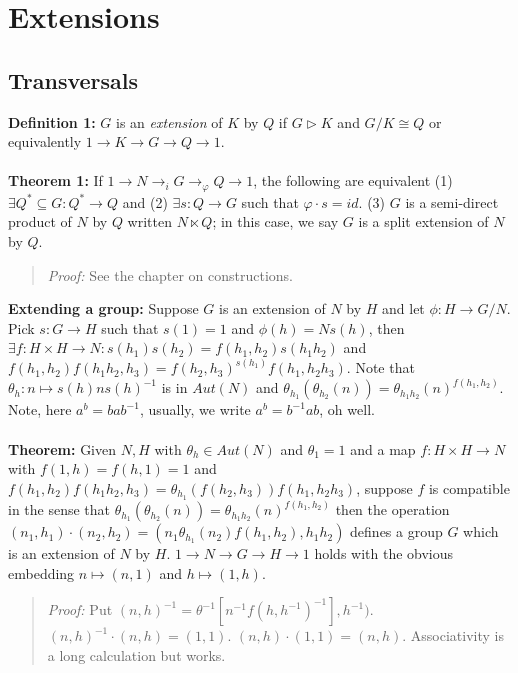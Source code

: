 \chapter{Extensions}
\section {Transversals} 
{\bf Definition 1:}
$G$ is an \emph{extension} of $K$ by $Q$ if $G \triangleright K$ and $G/K \cong Q$
or equivalently $1 \rightarrow K \rightarrow G \rightarrow Q \rightarrow 1$.
\\
\\
{\bf Theorem 1:}
If $1 \rightarrow N \rightarrow_{i} G \rightarrow_{\varphi} Q \rightarrow 1$, the following
are equivalent
(1) $\exists Q^* \subseteq G: Q^* \rightarrow Q$ and
(2) $\exists s:Q \rightarrow G$ such that $\varphi \cdot s = id$.
(3) $G$ is a semi-direct product of $N$ by $Q$ written $N \ltimes Q$; in this
case, we say $G$ is a split extension of $N$ by $Q$.
\begin{quote}
\emph{Proof:}  See the chapter on constructions.
\end{quote}
{\bf Extending a group:}
Suppose $G$ is an extension of $N$ by $H$ and let $\phi: H \rightarrow G/N$.  Pick
$s:G \rightarrow H$ such that $s(1)=1$ and $\phi(h) = N s(h)$, then 
$\exists f: H \times H \rightarrow N: s(h_1) s(h_2)= f(h_1, h_2) s(h_1 h_2)$
and $f(h_1, h_2) f(h_1 h_2, h_3)= f(h_2, h_3)^{s(h_1)} f(h_1 , h_2 h_3)$.  Note
that $\theta_h: n \mapsto s(h) n s(h)^{-1}$ is in $Aut(N)$ and
$\theta_{h_1}(\theta_{h_2}(n))= \theta_{h_1 h_2}(n)^{f(h_1, h_2)}$.  Note, here $a^b = b a b^{-1}$, usually,
we write $a^b = b ^ {-1} a b$, oh well.
\\
\\
{\bf Theorem:}
Given $N,H$ with $\theta_h \in Aut(N)$ and $\theta_1 = 1$ and a map
$f: H \times H \rightarrow N$ with $f(1,h)=f(h,1)=1$ and
$f(h_1, h_2) f(h_1 h_2 , h_3)= \theta_{h_1}(f(h_2, h_3)) f(h_1, h_2 h_3)$, 
suppose $f$ is compatible in the sense that 
$\theta_{h_1}(\theta_{h_2}(n))= \theta_{h_1h_2}(n)^{f(h_1, h_2)}$ then the
operation $(n_1, h_1) \cdot (n_2, h_2) = (n_1 \theta_{h_1}(n_2) f(h_1, h_2), h_1 h_2)$
defines a group $G$ which is an extension of $N$ by $H$.  
$1 \rightarrow N \rightarrow G \rightarrow H \rightarrow 1$ holds with the obvious
embedding $n \mapsto (n,1)$ and $h \mapsto (1,h)$.
\begin{quote}
\emph{Proof:}  Put $(n,h)^{-1}= \theta^{-1}[n^{-1} f(h,h^{-1})^{-1}], h^{-1})$.
$(n,h)^{-1} \cdot (n,h)= (1,1)$.   $(n,h) \cdot (1,1)= (n,h)$.  Associativity is a long
calculation but works.
\end{quote}
